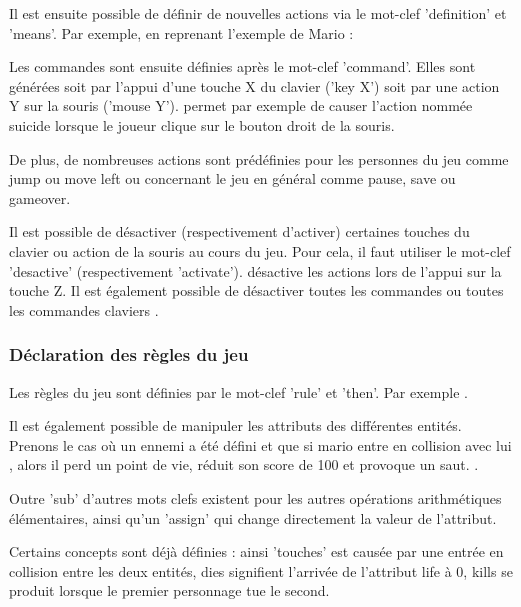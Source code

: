 Il est ensuite possible de définir de nouvelles actions via le mot-clef 'definition' et 'means'.
Par exemple, en reprenant l'exemple de Mario : 

Les commandes sont ensuite définies après le mot-clef 'command'. Elles sont générées soit par l'appui d'une touche X du clavier ('key X') soit par 
une action Y sur la souris ('mouse Y').
 permet par exemple de causer l'action nommée suicide lorsque le joueur clique sur le bouton droit de la souris.

De plus, de nombreuses actions sont prédéfinies pour les personnes du jeu comme jump ou move left ou concernant le jeu en général comme pause, save ou gameover.
 

Il est possible de désactiver (respectivement d'activer) certaines touches du clavier ou action de la souris au cours du jeu.
Pour cela, il faut utiliser le mot-clef 'desactive' (respectivement 'activate').
 désactive les actions lors de l'appui sur la touche Z.
Il est également possible de désactiver toutes les commandes  ou toutes les commandes claviers .

\subsubsection{Déclaration des règles du jeu}

Les règles du jeu sont définies par le mot-clef 'rule' et 'then'.
Par exemple .

Il est également possible de manipuler les attributs des différentes entités. Prenons le cas où un ennemi a été défini 
et que si mario entre en collision avec lui , alors il perd un point de vie, réduit son score de 100 et provoque un saut.
 .

Outre 'sub' d'autres mots clefs existent pour les autres opérations arithmétiques élémentaires, ainsi qu'un 'assign' qui change directement
la valeur de l'attribut.

Certains concepts sont déjà définies : ainsi 'touches' est causée par une entrée en collision entre les deux entités, dies signifient l'arrivée de l'attribut
life à 0, kills se produit lorsque le premier personnage tue le second.

